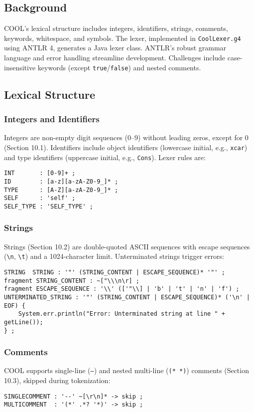 \documentclass[11pt, titlepage]{article}
\begin{document}
\subsection{Background}
COOL's lexical structure includes integers, identifiers, strings, comments, keywords, whitespace, and symbols. The lexer, implemented in \texttt{CoolLexer.g4} using ANTLR 4, generates a Java lexer class. ANTLR's robust grammar language and error handling streamline development. Challenges include case-insensitive keywords (except \texttt{true}/\texttt{false}) and nested comments.

\subsection{Lexical Structure}
\subsubsection{Integers and Identifiers}
Integers are non-empty digit sequences (0--9) without leading zeros, except for 0 (Section 10.1). Identifiers include object identifiers (lowercase initial, e.g., \texttt{xcar}) and type identifiers (uppercase initial, e.g., \texttt{Cons}). Lexer rules are:
\begin{lstlisting}
INT       : [0-9]+ ;
ID        : [a-z][a-zA-Z0-9_]* ;
TYPE      : [A-Z][a-zA-Z0-9_]* ;
SELF      : 'self' ;
SELF_TYPE : 'SELF_TYPE' ;
\end{lstlisting}

\subsubsection{Strings}
Strings (Section 10.2) are double-quoted ASCII sequences with escape sequences (\texttt{\textbackslash n}, \texttt{\textbackslash t}) and a 1024-character limit. Unterminated strings trigger errors:
\begin{lstlisting}
STRING  STRING : '"' (STRING_CONTENT | ESCAPE_SEQUENCE)* '"' ;
fragment STRING_CONTENT : ~["\\\n\r] ;
fragment ESCAPE_SEQUENCE : '\\' (['"\\] | 'b' | 't' | 'n' | 'f') ;
UNTERMINATED_STRING : '"' (STRING_CONTENT | ESCAPE_SEQUENCE)* ('\n' | EOF) {
    System.err.println("Error: Unterminated string at line " + getLine());
} ;
\end{lstlisting}

\subsubsection{Comments}
COOL supports single-line (\texttt{--}) and nested multi-line (\texttt{(* *)}) comments (Section 10.3), skipped during tokenization:
\begin{lstlisting}
SINGLECOMMENT : '--' ~[\r\n]* -> skip ;
MULTICOMMENT  : '(*' .*? '*)' -> skip ;
\end{lstlisting}
\end{document}

